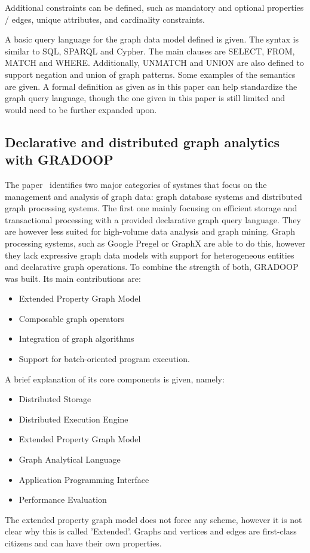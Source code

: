 Additional constraints can be defined, such as mandatory and optional properties / edges, unique attributes, and cardinality constraints. 

A basic query language for the graph data model defined is given. The syntax is similar to SQL, SPARQL and Cypher. The main clauses are SELECT, FROM, MATCH and WHERE. Additionally, UNMATCH and UNION are also defined to support negation and union of graph patterns. Some examples of the semantics are given. A formal definition as given as in this paper can help standardize the graph query language, though the one given in this paper is still limited and would need to be further expanded upon. 

\subsection{Declarative and distributed graph analytics with GRADOOP}

The paper~\cite{10.14778/3229863.3236246} identifies two major categories of systmes that focus on the management and analysis of graph data: graph database systems and distributed graph processing systems. The first one mainly focusing on efficient storage and transactional processing with a provided declarative graph query language. They are however less suited for high-volume data analysis and graph mining. Graph processing systems, such as Google Pregel or GraphX are able to do this, however they lack expressive graph data models with support for heterogeneous entities and declarative graph operations. To combine the strength of both, GRADOOP was built. Its main contributions are: 
\begin{itemize}
    \item Extended Property Graph Model 
    \item Composable graph operators
    \item Integration of graph algorithms
    \item Support for batch-oriented program execution.
\end{itemize}
A brief explanation of its core components is given, namely: 
\begin{itemize}
    \item Distributed Storage
    \item Distributed Execution Engine
    \item Extended Property Graph Model
    \item Graph Analytical Language
    \item Application Programming Interface
    \item Performance Evaluation
\end{itemize}
The extended property graph model does not force any scheme, however it is not clear why this is called 'Extended'. Graphs and vertices and edges are first-class citizens and can have their own properties. 

